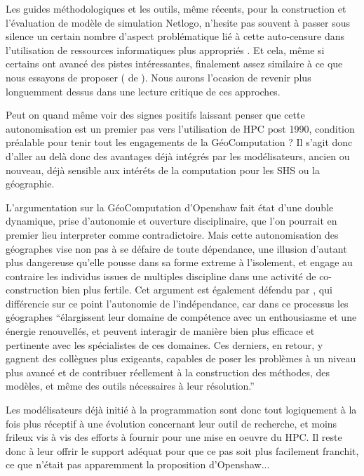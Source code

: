 Les guides méthodologiques et les outils, même récents, pour la construction et l'évaluation de modèle de simulation Netlogo, n'hesite pas souvent à passer sous silence un certain nombre d'aspect problématique lié à cette auto-censure dans l'utilisation de ressources informatiques plus appropriés \autocites{Gilbert2008, Grimm2011a}. Et cela, même si certains ont avancé des pistes intéressantes, finalement assez similaire à ce que nous essayons de proposer (\textcite{Behavior Search} de \textcite{Stonedahl2011a}). Nous aurons l'ocasion de revenir plus longuemment dessus dans une lecture critique de ces approches.

Peut on quand même voir des signes positifs laissant penser que cette autonomisation est un premier pas vers l'utilisation de HPC post 1990, condition préalable pour tenir tout les engagements de la GéoComputation ? Il s'agit donc d'aller au delà donc des avantages déjà intégrés par les modélisateurs, ancien ou nouveau, déjà sensible aux intéréts de la computation pour les SHS ou la géographie.

L’argumentation sur la GéoComputation d’Openshaw fait état d’une double dynamique, prise d'autonomie et ouverture disciplinaire, que l’on pourrait en premier lieu interpreter comme contradictoire. Mais cette autonomisation des géographes vise non pas à se défaire de toute dépendance, une illusion d’autant plus dangereuse qu’elle pousse dans sa forme extreme à l’isolement, et engage au contraire les individus issues de multiples discipline dans une activité de co-construction bien plus fertile. Cet argument est également défendu par \autocite[64]{Banos2013}, qui différencie sur ce point l’autonomie de l’indépendance, car dans ce processus les géographes \enquote{élargissent leur domaine de compétence avec un enthousiasme et une énergie renouvellés, et peuvent interagir de manière bien plus efficace et pertinente avec les spécialistes de ces domaines. Ces derniers, en retour, y gagnent des collègues plus exigeants, capables de poser les problèmes à un niveau plus avancé et de contribuer réellement à la construction des méthodes, des modèles, et même des outils nécessaires à leur résolution.}

Les modélisateurs déjà initié à la programmation sont donc tout logiquement à la fois plus réceptif à une évolution concernant leur outil de recherche, et moins frileux vis à vis des efforts à fournir pour une mise en oeuvre du HPC. Il reste donc à leur offrir le support adéquat pour que ce pas soit plus facilement franchit, ce que n'était pas apparemment la proposition d'Openshaw...

